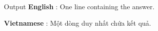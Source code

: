 Output
\textbf{    English   }   : One line containing the answer.  

\textbf{    Vietnamese   }   : Một dòng duy nhất chứa kết quả.
